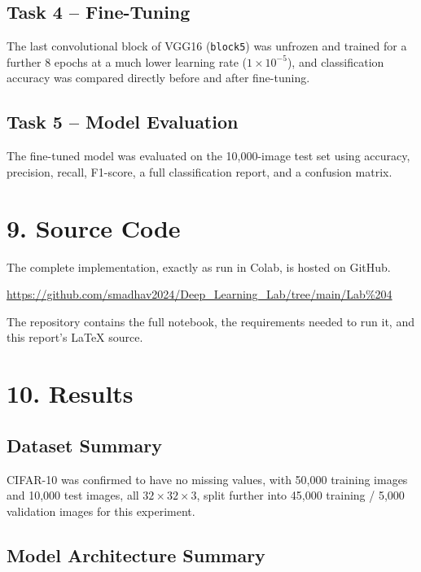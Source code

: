 \documentclass[11pt]{article}
\begin{document}
\subsection*{Task 4 -- Fine-Tuning}
The last convolutional block of VGG16 (\texttt{block5}) was unfrozen and trained for a further 8 epochs at a much lower learning rate ($1\times10^{-5}$), and classification accuracy was compared directly before and after fine-tuning.

\subsection*{Task 5 -- Model Evaluation}
The fine-tuned model was evaluated on the 10,000-image test set using accuracy, precision, recall, F1-score, a full classification report, and a confusion matrix.


\section*{9. Source Code}

The complete implementation, exactly as run in Colab, is hosted on GitHub.

\begin{center}
\url{https://github.com/smadhav2024/Deep_Learning_Lab/tree/main/Lab%204}
\end{center}

The repository contains the full notebook, the requirements needed to run it, and this report's LaTeX source.


\section*{10. Results}

\subsection*{Dataset Summary}

CIFAR-10 was confirmed to have no missing values, with 50,000 training images and 10,000 test images, all $32\times32\times3$, split further into 45,000 training / 5,000 validation images for this experiment.

\subsection*{Model Architecture Summary}
\end{document}

